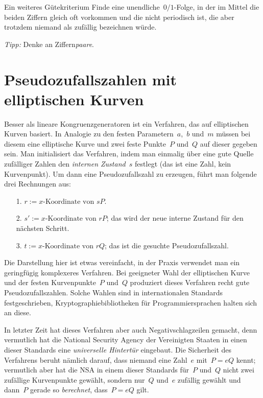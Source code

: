 \documentclass{../zirkelblatt}
\newcommand{\head}[1]{\section*{\rmfamily #1}}%
\begin{document}
\begin{aufgabeShaded}{Ein weiteres Gütekriterium}
Finde eine unendliche~$0/1$-Folge, in der im Mittel die beiden Ziffern gleich
oft vorkommen und die nicht periodisch ist, die aber trotzdem niemand als
zufällig bezeichnen würde.

\emph{Tipp:} Denke an Ziffern\emph{paare}.
\end{aufgabeShaded}


\head{Pseudozufallszahlen mit elliptischen Kurven}

Besser als lineare Kongruenzgeneratoren ist ein Verfahren, das auf elliptischen
Kurven basiert. In Analogie zu den festen Parametern~$a$,~$b$ und~$m$ müssen bei
diesem eine elliptische Kurve und zwei feste Punkte~$P$ und~$Q$ auf dieser
gegeben sein. Man initialisiert das Verfahren, indem man einmalig über eine
gute Quelle zufälliger Zahlen den \emph{internen Zustand~$s$} festlegt (das ist
eine Zahl, kein Kurvenpunkt). Um dann eine Pseudozufallszahl zu erzeugen,
führt man folgende drei Rechnungen aus:

\begin{enumerate}
\item[1.] $r := \text{$x$-Koordinate von~$sP$}$.
\item[2.] $s' := \text{$x$-Koordinate von~$rP$}$; das wird der neue interne Zustand
für den nächsten Schritt.
\item[3.] $t := \text{$x$-Koordinate von~$rQ$}$; das ist die gesuchte
Pseudozufallszahl.
\end{enumerate}

Die Darstellung hier ist etwas vereinfacht, in der Praxis verwendet man ein
geringfügig komplexeres Verfahren. Bei geeigneter Wahl der
elliptischen Kurve und der festen Kurvenpunkte~$P$ und~$Q$ produziert dieses
Verfahren recht gute Pseudozufallszahlen. Solche Wahlen sind in internationalen
Standards festgeschrieben, Kryptographiebibliotheken für Programmiersprachen
halten sich an diese.

In letzter Zeit hat dieses Verfahren aber auch Negativschlagzeilen gemacht,
denn vermutlich hat die National Security Agency der Vereinigten Staaten in
einen dieser Standards eine \emph{universelle Hintertür} eingebaut. Die
Sicherheit des Verfahrens beruht nämlich darauf, dass niemand eine Zahl~$e$
mit~$P = eQ$ kennt; vermutlich aber hat die NSA in einem dieser Standards
für~$P$ und~$Q$ nicht zwei zufällige Kurvenpunkte gewählt, sondern nur~$Q$
und~$e$ zufällig gewählt und dann~$P$ gerade so \emph{berechnet}, dass~$P = eQ$
gilt.
\end{document}
